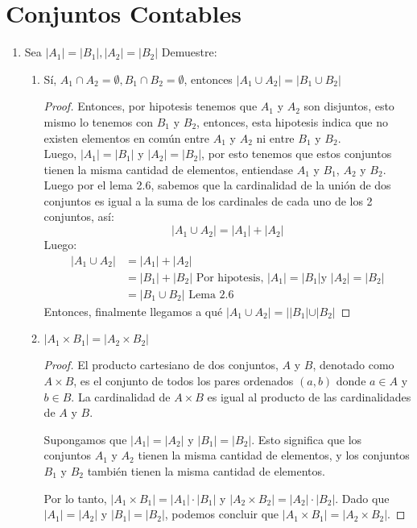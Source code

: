 \documentclass{article}
\begin{document}
\section{Conjuntos Contables}
\begin{enumerate}
  \item Sea $|A_1|=|B_1| , |A_2|=|B_2|$ Demuestre:
    \begin{enumerate}
      \item Sí, $A_1 \cap A_2 = \emptyset, B_1 \cap B_2 = \emptyset$, entonces $|A_1 \cup  A_2| = |B_1 \cup B_2|$
	\begin{proof}
	  Entonces, por hipotesis tenemos que $A_1$ y $A_2$ son disjuntos, esto mismo lo tenemos con $B_1$ y $B_2$, entonces, esta hipotesis indica que no existen elementos en común entre $A_1$ y $A_2$ ni entre $B_1$ y $B_2$.\\ 
	  Luego, $|A_1| = |B_1|$ y $|A_2| = |B_2|$, por esto tenemos que estos conjuntos tienen la misma cantidad de elementos, entiendase $A_1$ y $B_1$, $A_2$ y $B_2$. \\ 
	  Luego por el lema 2.6, sabemos que la cardinalidad de la unión de dos conjuntos es igual a la suma de los cardinales de cada uno de los 2 conjuntos, así:\\ 
	  $$|A_1 \cup A_2| = |A_1| + |A_2|$$  
Luego:	  
	  \begin{align*}
	    |A_1 \cup A_2| &= |A_1| + |A_2| \\ 
	    &= |B_1| + |B_2| \text{ Por hipotesis, $|A_1| = |B_1|$y $|A_2| = |B_2|$}\\ 
	    &= |B_1 \cup B_2| \text{ Lema 2.6 }
	  \end{align*} 
	Entonces, finalmente llegamos a qué $|A_1 \cup A_2| = ||B_1| \cup |B_2|$ 
	\end{proof}

      \item $|A_1 \times B_1| = |A_2 \times B_2|$
	\begin{proof}
	  El producto cartesiano de dos conjuntos, $A$ y $B$, denotado como $A \times B$, es el conjunto de todos los pares ordenados $(a, b)$ donde $a \in A$ y $b \in B$. La cardinalidad de $A \times B$ es igual al producto de las cardinalidades de $A$ y $B$.

	  Supongamos que $|A_1| = |A_2|$ y $|B_1| = |B_2|$. Esto significa que los conjuntos $A_1$ y $A_2$ tienen la misma cantidad de elementos, y los conjuntos $B_1$ y $B_2$ también tienen la misma cantidad de elementos.

	  Por lo tanto, $|A_1 \times B_1| = |A_1| \cdot |B_1|$ y $|A_2 \times B_2| = |A_2| \cdot |B_2|$. Dado que $|A_1| = |A_2|$ y $|B_1| = |B_2|$, podemos concluir que $|A_1 \times B_1| = |A_2 \times B_2|$.
	\end{proof}


\end{enumerate}
\end{enumerate}
\end{document}

